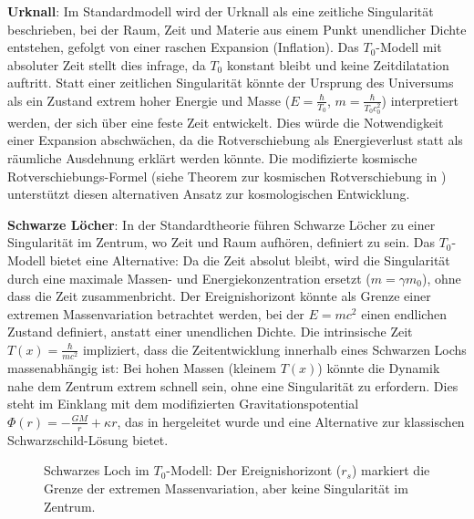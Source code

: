 \documentclass[a4paper,12pt]{article}
\newcommand{\Tfield}{T(x)}
\begin{document}
	\textbf{Urknall}: Im Standardmodell wird der Urknall als eine zeitliche Singularität beschrieben, bei der Raum, Zeit und Materie aus einem Punkt unendlicher Dichte entstehen, gefolgt von einer raschen Expansion (Inflation). Das \( T_0 \)-Modell mit absoluter Zeit stellt dies infrage, da \( T_0 \) konstant bleibt und keine Zeitdilatation auftritt. Statt einer zeitlichen Singularität könnte der Ursprung des Universums als ein Zustand extrem hoher Energie und Masse (\( E = \frac{\hbar}{T_0} \), \( m = \frac{\hbar}{T_0 c_0^2} \)) interpretiert werden, der sich über eine feste Zeit entwickelt. Dies würde die Notwendigkeit einer Expansion abschwächen, da die Rotverschiebung als Energieverlust statt als räumliche Ausdehnung erklärt werden könnte. Die modifizierte kosmische Rotverschiebungs-Formel (siehe Theorem zur kosmischen Rotverschiebung in \cite{wesentlicheFormalismen}\relax) unterstützt diesen alternativen Ansatz zur kosmologischen Entwicklung.
	
	\textbf{Schwarze Löcher}: In der Standardtheorie führen Schwarze Löcher zu einer Singularität im Zentrum, wo Zeit und Raum aufhören, definiert zu sein. Das \( T_0 \)-Modell bietet eine Alternative: Da die Zeit absolut bleibt, wird die Singularität durch eine maximale Massen- und Energiekonzentration ersetzt (\( m = \gamma m_0 \)), ohne dass die Zeit zusammenbricht. Der Ereignishorizont könnte als Grenze einer extremen Massenvariation betrachtet werden, bei der \( E = m c^2 \) einen endlichen Zustand definiert, anstatt einer unendlichen Dichte. Die intrinsische Zeit \(\Tfield = \frac{\hbar}{m c^2}\) impliziert, dass die Zeitentwicklung innerhalb eines Schwarzen Lochs massenabhängig ist: Bei hohen Massen (kleinem \(\Tfield\)) könnte die Dynamik nahe dem Zentrum extrem schnell sein, ohne eine Singularität zu erfordern. Dies steht im Einklang mit dem modifizierten Gravitationspotential \(\Phi(r) = -\frac{GM}{r} + \kappa r\), das in \cite{wesentlicheFormalismen}\relax hergeleitet wurde und eine Alternative zur klassischen Schwarzschild-Lösung bietet.
	
	\begin{figure}[h]
		\centering
		\caption{Schwarzes Loch im \( T_0 \)-Modell: Der Ereignishorizont (\( r_s \)) markiert die Grenze der extremen Massenvariation, aber keine Singularität im Zentrum.}
	\end{figure}
	
\end{document}
